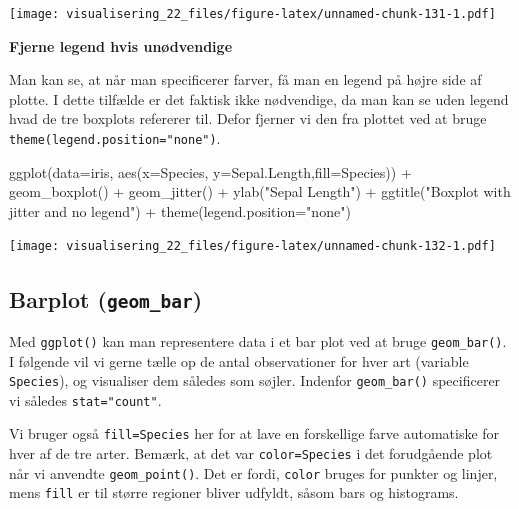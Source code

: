 \documentclass[
]{book}
\newenvironment{Shaded}{\begin{snugshade}}{\end{snugshade}}
\newcommand{\AttributeTok}[1]{\textcolor[rgb]{0.77,0.63,0.00}{#1}}
\newcommand{\FunctionTok}[1]{\textcolor[rgb]{0.00,0.00,0.00}{#1}}
\newcommand{\NormalTok}[1]{#1}
\newcommand{\SpecialCharTok}[1]{\textcolor[rgb]{0.00,0.00,0.00}{#1}}
\newcommand{\StringTok}[1]{\textcolor[rgb]{0.31,0.60,0.02}{#1}}
\begin{document}
\texttt{[image: visualisering\_22\_files/figure-latex/unnamed-chunk-131-1.pdf]}

\textbf{Fjerne legend hvis unødvendige}

Man kan se, at når man specificerer farver, få man en legend på højre side af plotte. I dette tilfælde er det faktisk ikke nødvendige, da man kan se uden legend hvad de tre boxplots refererer til. Defor fjerner vi den fra plottet ved at bruge \texttt{theme(legend.position="none")}.

\begin{Shaded}
\begin{Highlighting}[]
\FunctionTok{ggplot}\NormalTok{(}\AttributeTok{data=}\NormalTok{iris, }\FunctionTok{aes}\NormalTok{(}\AttributeTok{x=}\NormalTok{Species, }\AttributeTok{y=}\NormalTok{Sepal.Length,}\AttributeTok{fill=}\NormalTok{Species)) }\SpecialCharTok{+} 
  \FunctionTok{geom\_boxplot}\NormalTok{() }\SpecialCharTok{+} 
  \FunctionTok{geom\_jitter}\NormalTok{() }\SpecialCharTok{+}
  \FunctionTok{ylab}\NormalTok{(}\StringTok{"Sepal Length"}\NormalTok{) }\SpecialCharTok{+} 
  \FunctionTok{ggtitle}\NormalTok{(}\StringTok{"Boxplot with jitter and no legend"}\NormalTok{) }\SpecialCharTok{+}
  \FunctionTok{theme}\NormalTok{(}\AttributeTok{legend.position=}\StringTok{"none"}\NormalTok{)}
\end{Highlighting}
\end{Shaded}

\texttt{[image: visualisering\_22\_files/figure-latex/unnamed-chunk-132-1.pdf]}

\hypertarget{barplot-geom_bar}{%
\subsection{\texorpdfstring{Barplot (\texttt{geom\_bar})}{Barplot (geom\_bar)}}\label{barplot-geom_bar}}

Med \texttt{ggplot()} kan man representere data i et bar plot ved at bruge \texttt{geom\_bar()}. I følgende vil vi gerne tælle op de antal observationer for hver art (variable \texttt{Species}), og visualiser dem således som søjler. Indenfor \texttt{geom\_bar()} specificerer vi således \texttt{stat="count"}.

Vi bruger også \texttt{fill=Species} her for at lave en forskellige farve automatiske for hver af de tre arter. Bemærk, at det var \texttt{color=Species} i det forudgående plot når vi anvendte \texttt{geom\_point()}. Det er fordi, \texttt{color} bruges for punkter og linjer, mens \texttt{fill} er til større regioner bliver udfyldt, såsom bars og histograms.
\end{document}
